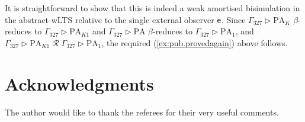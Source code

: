\documentclass{LMCS}
\newcommand{\with}{\mathbin \rhd}
\newcommand{\sobs}{{\ownfnt e}}
\newcommand{\calR}{\mathbin{\mathcal{R}}}
\begin{document}
It is straightforward to show that this is indeed a weak amortised bisimulation in the abstract wLTS relative to the single
external observer $\sobs$. Since $\Gamma_{327} \with \text{PA}_K$ $\beta$-reduces to $\Gamma_{327} \with \text{PA}_{K1}$
and $\Gamma_{327} \with \text{PA}$ $\beta$-reduces to $\Gamma_{327} \with \text{PA}_1$, and 
$\Gamma_{327} \with \text{PA}_{K1} \;\calR\; \Gamma_{327} \with \text{PA}_1$, the required (\ref{ex:pub.provedagain}) above
follows. 

\section*{Acknowledgments}
The author would like to thank the referees for their very useful comments. 





 
\end{document}
